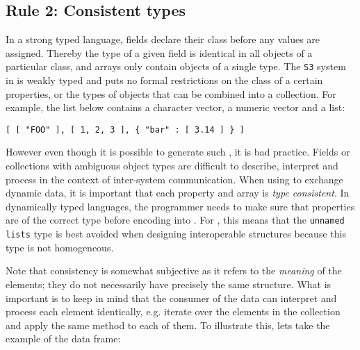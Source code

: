 \subsection{Rule 2: Consistent types}

In a strong typed language, fields declare their class before any values are assigned. Thereby the type of a given field is identical in all objects of a particular class, and arrays only contain objects of a single type. The \texttt{S3} system in \R is weakly typed and puts no formal restrictions on the class of a certain properties, or the types of objects that can be combined into a collection. For example, the list below contains a character vector, a numeric vector and a list:

\begin{knitrout}\mycodesize
{}\color{fgcolor}\begin{kframe}
\begin{alltt}
 \hlkwb{<-} \hlstd{(}\hlstd{,} \hlopt{:}\hlstd{,} \hlstd{(} 
\hlstd{(}
\end{alltt}
\begin{verbatim}
[ [ "FOO" ], [ 1, 2, 3 ], { "bar" : [ 3.14 ] } ]
\end{verbatim}
\end{kframe}
\end{knitrout}


 However even though it is possible to generate such \JSON, it is bad practice. Fields or collections with ambiguous object types are difficult to describe, interpret and process in the context of inter-system communication. When using \JSON to exchange dynamic data, it is important that each property and array is \emph{type consistent}. In dynamically typed languages, the programmer needs to make sure that properties are of the correct type before encoding into \JSON. For \R, this means that the  \texttt{unnamed lists} type is best avoided when designing interoperable structures because this type is not homogeneous. 
 
 Note that consistency is somewhat subjective as it refers to the \emph{meaning} of the elements; they do not necessarily have precisely the same structure. What is important is to keep in mind that the consumer of the data can interpret and process each element identically, e.g. iterate over the elements in the collection and apply the same method to each of them. To illustrate this, lets take the example of the data frame: 

